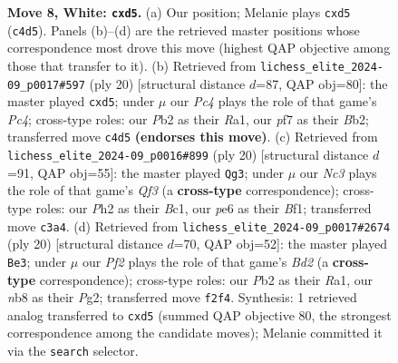 \documentclass[11pt]{article}
\begin{document}
\begin{figure}[p]
\caption{\textbf{Move 8, White: \texttt{cxd5}.} (a) Our position; Melanie plays \texttt{cxd5} (\texttt{c4d5}). Panels (b)--(d) are the retrieved master positions whose correspondence most drove this move (highest QAP objective among those that transfer to it). (b) Retrieved from \texttt{lichess\_elite\_2024-09\_p0017\#597} (ply 20) [structural distance $d$=87, QAP obj=80]: the master played \texttt{cxd5}; under $\mu$ our \emph{Pc4} plays the role of that game's \emph{Pc4}; cross-type roles: our \emph{P}b2 as their \emph{R}a1, our \emph{p}f7 as their \emph{B}b2; transferred move \texttt{c4d5} \textbf{(endorses this move)}. (c) Retrieved from \texttt{lichess\_elite\_2024-09\_p0016\#899} (ply 20) [structural distance $d$=91, QAP obj=55]: the master played \texttt{Qg3}; under $\mu$ our \emph{Nc3} plays the role of that game's \emph{Qf3} (a \textbf{cross-type} correspondence); cross-type roles: our \emph{P}h2 as their \emph{B}c1, our \emph{p}e6 as their \emph{B}f1; transferred move \texttt{c3a4}. (d) Retrieved from \texttt{lichess\_elite\_2024-09\_p0017\#2674} (ply 20) [structural distance $d$=70, QAP obj=52]: the master played \texttt{Be3}; under $\mu$ our \emph{Pf2} plays the role of that game's \emph{Bd2} (a \textbf{cross-type} correspondence); cross-type roles: our \emph{P}b2 as their \emph{R}a1, our \emph{n}b8 as their \emph{P}g2; transferred move \texttt{f2f4}. Synthesis: 1 retrieved analog transferred to \texttt{cxd5} (summed QAP objective 80, the strongest correspondence among the candidate moves); Melanie committed it via the \texttt{search} selector.}
\label{fig:thought-m14}
\end{figure}

\clearpage
\end{document}
